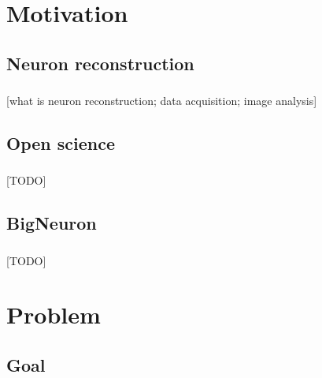 \documentclass{beamer}
\begin{document}

\frame{\titlepage}

\section{Motivation}
\begin{frame}\frametitle{\secname}
\end{frame}

\subsection{Neuron reconstruction}
\begin{frame}\frametitle{\subsecname}
	[what is neuron reconstruction; data acquisition; image analysis]
\end{frame}

\subsection{Open science}
\begin{frame}\frametitle{\subsecname}
	[TODO]
\end{frame}

\subsection{BigNeuron}
\begin{frame}\frametitle{\subsecname}
	[TODO]
\end{frame}

\section{Problem}
\begin{frame}\frametitle{\secname}
\end{frame}

\subsection{Goal}
\begin{frame}\frametitle{\subsecname}
\end{frame}
\end{document}
